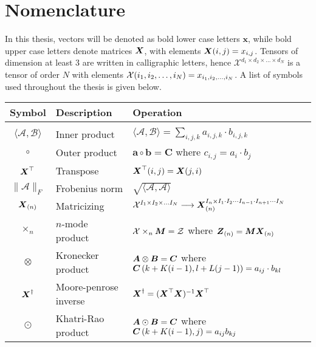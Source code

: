 \section{Nomenclature}

In this thesis, vectors will be denoted as bold lower case letters $\boldsymbol{x}$, while bold upper case letters denote matrices $\boldsymbol{X}$, with elements $\boldsymbol{X}(i, j) = x_{i,j}$. Tensors of dimension at least 3 are written in calligraphic letters, hence $\mathcal{X}^{d_1\times d_2 \times \dots \times d_N}$ is a tensor of order $N$ with elements $\mathcal{X}(i_1, i_2, \dots, i_N) = x_{i_1, i_2, \dots, i_N}$. A list of symbols used throughout the thesis is given below. 

\vspace{1cm}

\begin{tabular}{cll}
    \textbf{Symbol} & \textbf{Description} & \textbf{Operation}  \\ \hline
    & & \\
    $\langle \mathcal{A}, \mathcal{B}\rangle$ & Inner product & $\langle \mathcal{A}, \mathcal{B}\rangle = \sum_{i,j,k} a_{i,j,k}\cdot b_{i,j,k}$ \\[2ex]
    $\circ$ &  Outer product & $\boldsymbol{a} \circ \boldsymbol{b} = \boldsymbol{C}$ where $c_{i,j} = a_i \cdot b_j$ \\[2ex]
    $\boldsymbol{X}^{\top}$ & Transpose & $\boldsymbol{X}^{\top}(i,j) = \boldsymbol{X}(j,i)$ \\[2ex]
    $\| \mathcal{A} \|_F$ & Frobenius norm & $\sqrt{\langle \mathcal{A}, \mathcal{A}\rangle}$ \\[2ex]
    $\boldsymbol{X}_{(n)}$ & Matricizing & $\mathcal{X}^{I_1 \times I_2 \times \dots I_N} \longrightarrow \boldsymbol{X}_{(n)}^{I_n \times I_1 \cdot I_2 \cdots I_{n-1} \cdot I_{n+1} \cdots I_N}$ \\[2ex]
    $\times_n$ & $n$-mode product & $\mathcal{X}\times_n \boldsymbol{M} = \mathcal{Z}$ where $\boldsymbol{Z}_{(n)} = \boldsymbol{M}\boldsymbol{X}_{(n)}$ \\[2ex]
    $\otimes$ & Kronecker product & $\boldsymbol{A}\otimes \boldsymbol{B} = \boldsymbol{C}$ where $\boldsymbol{C}\left(k + K(i-1), l + L(j-1)\right) = a_{ij} \cdot b_{kl}$ \\[2ex]
    $\boldsymbol{X}^{\dagger}$ & Moore-penrose inverse & $\boldsymbol{X}^{\dagger} = ( \boldsymbol{X}^\top \boldsymbol{X})^{-1}\boldsymbol{X}^{\top}$ \\[2ex]
    $\odot$ & Khatri-Rao product & $\boldsymbol{A} \odot \boldsymbol{B} = \boldsymbol{C}$ where $\boldsymbol{C}\left(k + K(i-1), j\right) = a_{ij}b_{kj}$
\end{tabular}